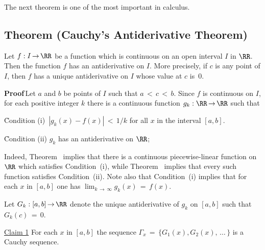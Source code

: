 {%

\VV

        The next theorem is one of the most important in calculus. 

\VV

             \subsection{\small{\bf Theorem} (Cauchy's Antiderivative Theorem)}
                         \label{ThmE45.125B}

\V

        Let $f:I \,{\rightarrow}\, {\RR}$ be a function which is continuous on an open interval $I$ in ${\RR}$.
    Then the function $f$ has an antiderivative on $I$. More precisely, if $c$ is any point of $I$,
    then $f$ has a unique antiderivative on $I$ whose value at $c$ is~$0$.

\V

        {\bf Proof}\,Let $a$ and $b$ be points of $I$ such that $a\,<\,c\,<\,b$.
    Since $f$ is continuous on $I$, for each positive integer $k$ there is a continuous function $g_{k}:{\RR} \,{\rightarrow}\, {\RR}$ such that

\VA

        \h Condition (i)\, $|g_{k}(x) - f(x)|\,<\,1/k$ for all $x$ in the interval $[a,b]$.

        \h Condition (ii) $g_{k}$ has an antiderivative on ${\RR}$;



\VA

\hspace*{\parindent}Indeed, Theorem~ implies that there is a continuous piecewise-linear function on ${\RR}$ which satisfies Condition~(i),
    while Theorem~ implies that every such function satisfies Condition~(ii).
    Note also that Condition~(i) implies that for each $x$ in $[a,b]$ one has ${\displaystyle \lim_{k \,{\rightarrow}\, {\infty}} g_{k}(x) \,=\, f(x)}$.

        Let $G_{k}:[a,b] \,{\rightarrow}\, {\RR}$ denote the unique antiderivative of $g_{k}$ on $[a,b]$ such that $G_{k}(c) \,=\, 0$.

\V

        \underline{Claim 1} For each $x$ in $[a,b]$ the sequence ${\Gamma}_{x} \,=\, \{G_{1}(x), G_{2}(x),\,{\ldots}\,\}$ is a Cauchy sequence.

}
